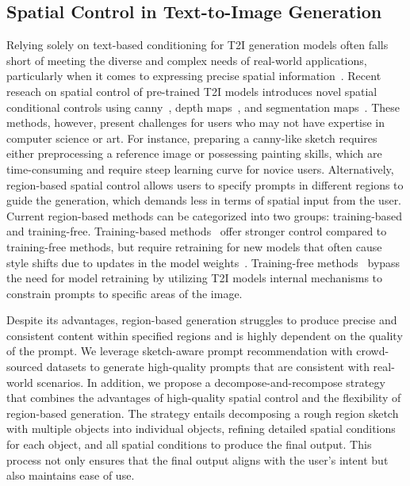 \subsection{Spatial Control in Text-to-Image Generation}
Relying solely on text-based conditioning for T2I generation models often falls short of meeting the diverse and complex needs of real-world applications, particularly when it comes to expressing precise spatial information~\cite{zhang2023adding}.
Recent reseach on spatial control of pre-trained T2I models introduces novel spatial conditional controls using canny~\cite{canny1986computational}, depth maps~\cite{lasinger2019towards}, and segmentation maps~\cite{zhou2017scene}.
These methods, however, present challenges for users who may not have expertise in computer science or art.
For instance, preparing a canny-like sketch requires either preprocessing a reference image or possessing painting skills, 
which are time-consuming and require steep learning curve for novice users.
Alternatively, region-based spatial control allows users to specify prompts in different regions to guide the generation, which demands less in terms of spatial input from the user.
Current region-based methods can be categorized into two groups: training-based and training-free. Training-based methods~\cite{wang2024instancediffusion,li2023gligen,zheng2023layoutdiffusion} offer stronger control compared to training-free methods, but require retraining for new models that often cause style shifts due to updates in the model weights~\cite{omost}.
Training-free methods~\cite{endo2023masked,kim2023dense,bar2023multidiffusion,chen2024training,xie2023boxdiff} bypass the need for model retraining by utilizing T2I models internal mechanisms to constrain prompts to specific areas of the image. 

Despite its advantages, region-based generation struggles to produce precise and consistent content within specified regions and is highly dependent on the quality of the prompt.
We leverage sketch-aware prompt recommendation with crowd-sourced datasets to generate high-quality prompts that are consistent with real-world scenarios.
In addition, we propose a decompose-and-recompose strategy that combines the advantages of high-quality spatial control and the flexibility of region-based generation.
The strategy entails decomposing a rough region sketch with multiple objects into individual objects, refining detailed spatial conditions for each object, and all spatial conditions to produce the final output.
This process not only ensures that the final output aligns with the user's intent but also maintains ease of use.




